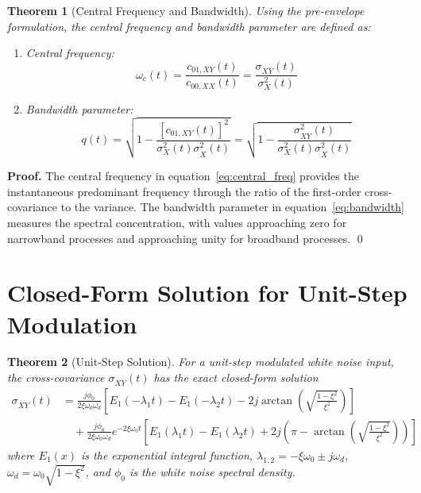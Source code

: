 \documentclass[12pt,a4paper]{article}
\newtheorem{theorem}{Theorem}[section]
\renewenvironment{proof}{\noindent\textbf{Proof.}}{\qed}
\begin{document}
\begin{theorem}[Central Frequency and Bandwidth]\label{thm:freq_bandwidth}
Using the pre-envelope formulation, the central frequency and bandwidth parameter are defined as:

\begin{enumerate}[label=(\roman*)]
\item Central frequency:
\begin{equation}\label{eq:central_freq}
\omega_c(t) = \frac{c_{01,XY}(t)}{c_{00,XX}(t)} = \frac{\sigma_{X\dot{Y}}(t)}{\sigma_X^2(t)}
\end{equation}

\item Bandwidth parameter:
\begin{equation}\label{eq:bandwidth}
q(t) = \sqrt{1 - \frac{[c_{01,XY}(t)]^2}{\sigma_X^2(t)\sigma_{\dot{X}}^2(t)}} = \sqrt{1 - \frac{\sigma_{X\dot{Y}}^2(t)}{\sigma_X^2(t)\sigma_{\dot{X}}^2(t)}}
\end{equation}
\end{enumerate}
\end{theorem}

\begin{proof}
The central frequency in equation~\eqref{eq:central_freq} provides the instantaneous predominant frequency through the ratio of the first-order cross-covariance to the variance. The bandwidth parameter in equation~\eqref{eq:bandwidth} measures the spectral concentration, with values approaching zero for narrowband processes and approaching unity for broadband processes.
\end{proof}

\section{Closed-Form Solution for Unit-Step Modulation}

\begin{theorem}[Unit-Step Solution]\label{thm:unit_step}
For a unit-step modulated white noise input, the cross-covariance $\sigma_{X\dot{Y}}(t)$ has the exact closed-form solution
\begin{align}\label{eq:unit_step_solution}
\sigma_{X\dot{Y}}(t) &= \frac{j\phi_0}{2\xi\omega_0\omega_d} \left[ E_1(-\lambda_1 t) - E_1(-\lambda_2 t) - 2j \arctan\left(\sqrt{\frac{1-\xi^2}{\xi^2}}\right) \right] \nonumber \\
&\quad + \frac{j\phi_0}{2\xi\omega_0\omega_d} e^{-2\xi\omega_0 t} \left[ E_1(\lambda_1 t) - E_1(\lambda_2 t) + 2j\left(\pi - \arctan\left(\sqrt{\frac{1-\xi^2}{\xi^2}}\right)\right) \right]
\end{align}
where $E_1(x)$ is the exponential integral function, $\lambda_{1,2} = -\xi\omega_0 \pm j\omega_d$, $\omega_d = \omega_0\sqrt{1-\xi^2}$, and $\phi_0$ is the white noise spectral density.
\end{theorem}
\end{document}
